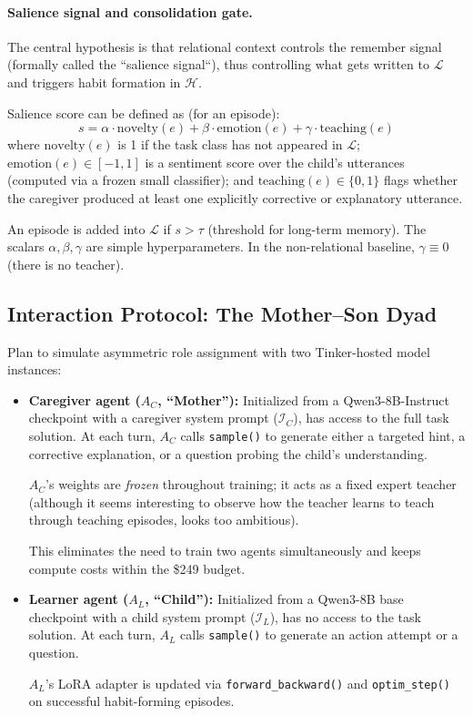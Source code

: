 \documentclass[11pt]{article}
\begin{document}
\paragraph{Salience signal and consolidation gate.}
The central hypothesis is that relational context controls the remember signal (formally called the ``salience signal``), thus controlling what gets written to $\mathcal{L}$ and triggers habit formation in $\mathcal{H}$. 

Salience score can be defined as (for an episode):
\[
s = \alpha \cdot \text{novelty}(e) + \beta \cdot \text{emotion}(e) + \gamma \cdot \text{teaching}(e)
\]
where $\text{novelty}(e)$ is 1 if the task class has not appeared in $\mathcal{L}$; $\text{emotion}(e) \in [-1,1]$ is a sentiment score over the child's utterances (computed via a frozen small classifier); and $\text{teaching}(e) \in \{0,1\}$ flags whether the caregiver produced at least one explicitly corrective or explanatory utterance. 

An episode is added into $\mathcal{L}$ if $s > \tau$ (threshold for long-term memory). The scalars $\alpha, \beta, \gamma$ are simple hyperparameters. In the non-relational baseline, $\gamma \equiv 0$ (there is no teacher).

\subsection{Interaction Protocol: The Mother--Son Dyad}
Plan to simulate asymmetric role assignment with two Tinker-hosted model instances:

\begin{itemize}
    \item \textbf{Caregiver agent ($A_C$, ``Mother''):} Initialized from a Qwen3-8B-Instruct checkpoint with a caregiver system prompt ($\mathcal{I}_C$), has access to the full task solution. At each turn, $A_C$ calls \texttt{sample()} to generate either a targeted hint, a corrective explanation, or a question probing the child's understanding. 
    
    $A_C$'s weights are \emph{frozen} throughout training; it acts as a fixed expert teacher (although it seems interesting to observe how the teacher learns to teach through teaching episodes, looks too ambitious). 
    
    This eliminates the need to train two agents simultaneously and keeps compute costs within the \$249 budget.

    \item \textbf{Learner agent ($A_L$, ``Child''):} Initialized from a Qwen3-8B base checkpoint with a child system prompt ($\mathcal{I}_L$), has no access to the task solution. At each turn, $A_L$ calls \texttt{sample()} to generate an action attempt or a question. 
    
    $A_L$'s LoRA adapter is updated via \texttt{forward\_backward()} and \texttt{optim\_step()} on successful habit-forming episodes.
\end{itemize}
\end{document}
